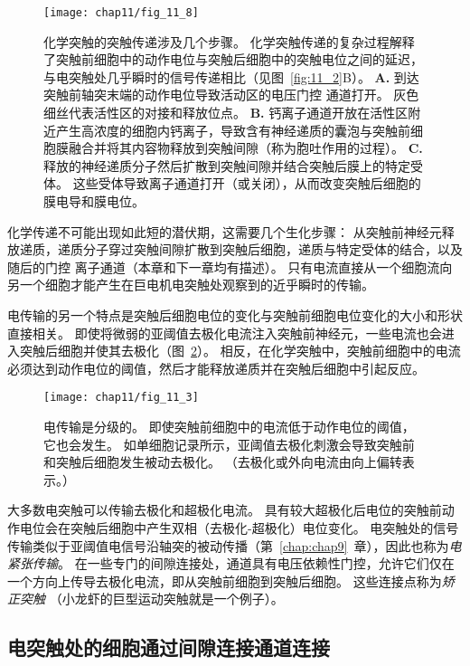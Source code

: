 \begin{figure}[htbp]
	\centering
	\texttt{[image: chap11/fig\_11\_8]}
	\caption{化学突触的突触传递涉及几个步骤。
		化学突触传递的复杂过程解释了突触前细胞中的动作电位与突触后细胞中的突触电位之间的延迟，与电突触处几乎瞬时的信号传递相比（见图~\ref{fig:11_2}B）。
		\textbf{A.} 到达突触前轴突末端的动作电位导致活动区的电压门控  通道打开。
		灰色细丝代表活性区的对接和释放位点。
		\textbf{B.} 钙离子通道开放在活性区附近产生高浓度的细胞内钙离子，导致含有神经递质的囊泡与突触前细胞膜融合并将其内容物释放到突触间隙（称为胞吐作用的过程）。
		\textbf{C.} 释放的神经递质分子然后扩散到突触间隙并结合突触后膜上的特定受体。
		这些受体导致离子通道打开（或关闭），从而改变突触后细胞的膜电导和膜电位。}
	\label{fig:11_8}
\end{figure}


化学传递不可能出现如此短的潜伏期，这需要几个生化步骤：
从突触前神经元释放递质，递质分子穿过突触间隙扩散到突触后细胞，递质与特定受体的结合，以及随后的门控 离子通道（本章和下一章均有描述）。
只有电流直接从一个细胞流向另一个细胞才能产生在巨电机电突触处观察到的近乎瞬时的传输。


电传输的另一个特点是突触后细胞电位的变化与突触前细胞电位变化的大小和形状直接相关。
即使将微弱的亚阈值去极化电流注入突触前神经元，一些电流也会进入突触后细胞并使其去极化（图~\ref{fig:11_3}）。
相反，在化学突触中，突触前细胞中的电流必须达到动作电位的阈值，然后才能释放递质并在突触后细胞中引起反应。


\begin{figure}[htbp]
	\centering
	\texttt{[image: chap11/fig\_11\_3]}
	\caption{电传输是分级的。
		即使突触前细胞中的电流低于动作电位的阈值，它也会发生。
		如单细胞记录所示，亚阈值去极化刺激会导致突触前和突触后细胞发生被动去极化。
		（去极化或外向电流由向上偏转表示。）}
	\label{fig:11_3}
\end{figure}


大多数电突触可以传输去极化和超极化电流。
具有较大超极化后电位的突触前动作电位会在突触后细胞中产生双相（去极化-超极化）电位变化。
电突触处的信号传输类似于亚阈值电信号沿轴突的被动传播（第~\ref{chap:chap9}~章），因此也称为\textit{电紧张传输}。
在一些专门的间隙连接处，通道具有电压依赖性门控，允许它们仅在一个方向上传导去极化电流，即从突触前细胞到突触后细胞。
这些连接点称为\textit{矫正突触}
（小龙虾的巨型运动突触就是一个例子）。



\subsection{电突触处的细胞通过间隙连接通道连接}

